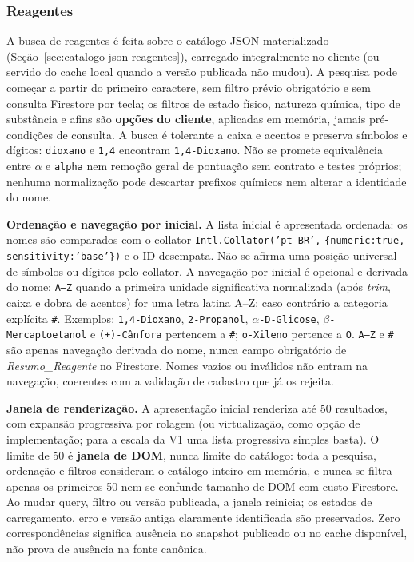 \subsubsection{Reagentes}
A busca de reagentes é feita sobre o catálogo JSON materializado (Seção~\ref{sec:catalogo-json-reagentes}),
carregado integralmente no cliente (ou servido do cache local quando a versão
publicada não mudou). A pesquisa pode começar a partir do primeiro caractere,
sem filtro prévio obrigatório e sem consulta Firestore por tecla; os filtros de
estado físico, natureza química, tipo de substância e afins são \textbf{opções
do cliente}, aplicadas em memória, jamais pré-condições de consulta. A busca é
tolerante a caixa e acentos e preserva símbolos e dígitos: \texttt{dioxano} e
\texttt{1,4} encontram \texttt{1,4-Dioxano}. Não se promete equivalência entre
\texttt{$\alpha$} e \texttt{alpha} nem remoção geral de pontuação sem contrato e
testes próprios; nenhuma normalização pode descartar prefixos químicos nem
alterar a identidade do nome.

\textbf{Ordenação e navegação por inicial.} A lista inicial é apresentada
ordenada: os nomes são comparados com o collator
\texttt{Intl.Collator('pt-BR',} \texttt{\{numeric:true,}
\texttt{sensitivity:'base'\})} e o ID desempata. Não se afirma uma
posição universal de símbolos ou dígitos pelo collator. A navegação por inicial
é opcional e derivada do nome: \texttt{A--Z} quando a primeira unidade
significativa normalizada (após \textit{trim}, caixa e dobra de acentos) for uma
letra latina A--Z; caso contrário a categoria explícita \texttt{\#}. Exemplos:
\texttt{1,4-Dioxano}, \texttt{2-Propanol}, \texttt{$\alpha$-D-Glicose},
\texttt{$\beta$-Mercaptoetanol} e \texttt{(+)-Cânfora} pertencem a \texttt{\#};
\texttt{o-Xileno} pertence a \texttt{O}. \texttt{A--Z} e \texttt{\#} são apenas
navegação derivada do nome, nunca campo obrigatório de \textit{Resumo\_Reagente}
no Firestore. Nomes vazios ou inválidos não entram na navegação, coerentes com a
validação de cadastro que já os rejeita.

\textbf{Janela de renderização.} A apresentação inicial renderiza até 50
resultados, com expansão progressiva por rolagem (ou virtualização, como opção
de implementação; para a escala da V1 uma lista progressiva simples basta). O
limite de 50 é \textbf{janela de DOM}, nunca limite do catálogo: toda a pesquisa,
ordenação e filtros consideram o catálogo inteiro em memória, e nunca se filtra
apenas os primeiros 50 nem se confunde tamanho de DOM com custo Firestore. Ao
mudar query, filtro ou versão publicada, a janela reinicia; os estados de
carregamento, erro e versão antiga claramente identificada são preservados.
Zero correspondências significa ausência no snapshot publicado ou no cache
disponível, não prova de ausência na fonte canônica.

